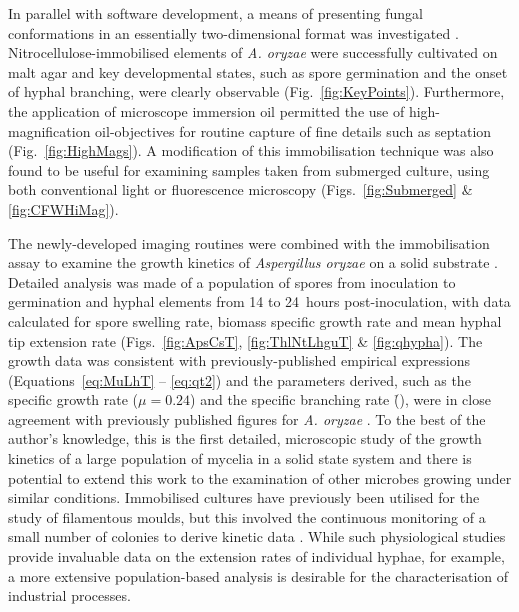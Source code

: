 In parallel with software development, a means of presenting fungal conformations in an essentially two-dimensional format was investigated \cite{barry2007}. Nitrocellulose-immobilised elements of \emph{A. oryzae} were successfully cultivated on malt agar and key developmental states, such as spore germination and the onset of hyphal branching, were clearly observable (Fig.~\ref{fig:KeyPoints}). Furthermore, the application of microscope immersion oil permitted the use of high-magnification oil-objectives for routine capture of fine details such as septation (Fig.~\ref{fig:HighMags}). A modification of this immobilisation technique was also found to be useful for examining samples taken from submerged culture, using both conventional light or fluorescence microscopy (Figs.~\ref{fig:Submerged} \& \ref{fig:CFWHiMag}).


The newly-developed imaging routines were combined with the immobilisation assay to examine the growth kinetics of \emph{Aspergillus oryzae} on a solid substrate \cite{barry2009}. Detailed analysis was made of a population of spores from inoculation to germination and hyphal elements from 14 to 24~hours post-inoculation, with data calculated for spore swelling rate, biomass specific growth rate and mean hyphal tip extension rate (Figs.~\ref{fig:ApsCsT}, \ref{fig:ThlNtLhguT} \& \ref{fig:qhypha}). The growth data was consistent with previously-published empirical expressions (Equations~\ref{eq:MuLhT} -- \ref{eq:qt2}) and the parameters derived, such as the specific growth rate (\h{$\mu = 0.24$}) and the specific branching rate (\h{}), were in close agreement with previously published figures for \emph{A. oryzae} \cite{carlsen1996a,spohr1997}. To the best of the author's knowledge, this is the first detailed, microscopic study of the growth kinetics of a large population of mycelia in a solid state system and there is potential to extend this work to the examination of other microbes growing under similar conditions. Immobilised cultures have previously been utilised for the study of filamentous moulds, but this involved the continuous monitoring of a small number of colonies to derive kinetic data \cite{trinci1974}. While such physiological studies provide invaluable data on the extension rates of individual hyphae, for example, a more extensive population-based analysis is desirable for the characterisation of industrial processes.


